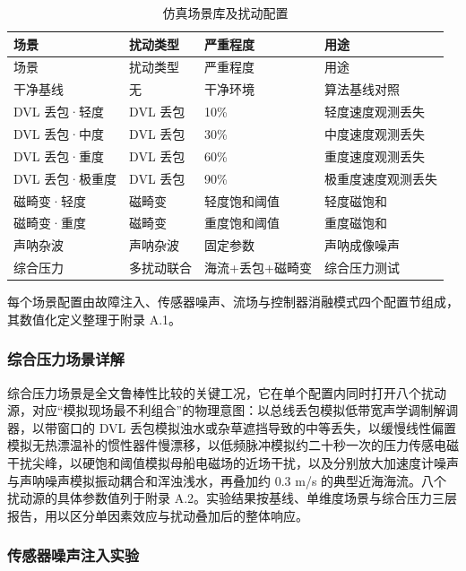 \begin{longtable}[]{@{}llll@{}}
\caption{仿真场景库及扰动配置}\label{tab:ch05-scenarios}\tabularnewline
\toprule\noalign{}
场景 & 扰动类型 & 严重程度 & 用途 \\
\midrule\noalign{}
\endfirsthead
\toprule\noalign{}
场景 & 扰动类型 & 严重程度 & 用途 \\
\midrule\noalign{}
\endhead
\bottomrule\noalign{}
\endlastfoot
干净基线 & 无 & 干净环境 & 算法基线对照 \\
DVL 丢包·轻度 & DVL 丢包 & 10\% & 轻度速度观测丢失 \\
DVL 丢包·中度 & DVL 丢包 & 30\% & 中度速度观测丢失 \\
DVL 丢包·重度 & DVL 丢包 & 60\% & 重度速度观测丢失 \\
DVL 丢包·极重度 & DVL 丢包 & 90\% & 极重度速度观测丢失 \\
磁畸变·轻度 & 磁畸变 & 轻度饱和阈值 & 轻度磁饱和 \\
磁畸变·重度 & 磁畸变 & 重度饱和阈值 & 重度磁饱和 \\
声呐杂波 & 声呐杂波 & 固定参数 & 声呐成像噪声 \\
综合压力 & 多扰动联合 & 海流+丢包+磁畸变 & 综合压力测试 \\
\end{longtable}

每个场景配置由故障注入、传感器噪声、流场与控制器消融模式四个配置节组成，其数值化定义整理于附录 A.1。

\subsubsection{综合压力场景详解}\label{sec:ch05-5-2-2}

综合压力场景是全文鲁棒性比较的关键工况，它在单个配置内同时打开八个扰动源，对应``模拟现场最不利组合''的物理意图：以总线丢包模拟低带宽声学调制解调器，以带窗口的 DVL 丢包模拟浊水或杂草遮挡导致的中等丢失，以缓慢线性偏置模拟无热漂温补的惯性器件慢漂移，以低频脉冲模拟约二十秒一次的压力传感电磁干扰尖峰，以硬饱和阈值模拟母船电磁场的近场干扰，以及分别放大加速度计噪声与声呐噪声模拟振动耦合和浑浊浅水，再叠加约 0.3 m/s 的典型近海海流。八个扰动源的具体参数值列于附录 A.2。实验结果按基线、单维度场景与综合压力三层报告，用以区分单因素效应与扰动叠加后的整体响应。

\subsubsection{传感器噪声注入实验}\label{sec:ch05-5-2-3}

